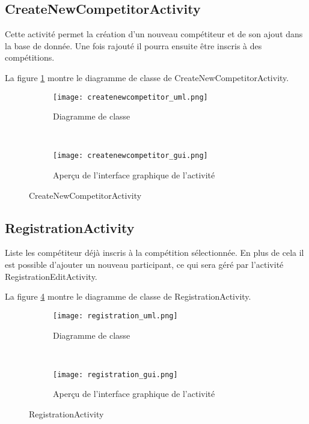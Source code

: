 \subsection{CreateNewCompetitorActivity}

Cette activité permet la création d'un nouveau compétiteur et de son ajout dans la base de donnée. Une fois rajouté il pourra ensuite être inscris à des compétitions.

La figure \ref{fig:createnewcompetitor_uml} montre le diagramme de classe de CreateNewCompetitorActivity.

\begin{figure}[htb!]
    \centering
    \begin{subfigure}[htb]{0.49\textwidth}
		\texttt{[image: createnewcompetitor\_uml.png]} 
		\caption{Diagramme de classe}
		\label{fig:createnewcompetitor_uml}
    \end{subfigure}
    ~ %
    \begin{subfigure}[htb]{0.49\textwidth}
		\texttt{[image: createnewcompetitor\_gui.png]} 
		\caption{Aperçu de l'interface graphique de l'activité}
		\label{fig:createnewcompetitor_gui}
    \end{subfigure}
    \caption{CreateNewCompetitorActivity}\label{fig:createnewcompetitor_fig}
\end{figure}

\subsection{RegistrationActivity}

Liste les compétiteur déjà inscris à la compétition sélectionnée. En plus de cela il est possible d'ajouter un nouveau participant, ce qui sera géré par l'activité RegistrationEditActivity.

La figure \ref{fig:registration_uml} montre le diagramme de classe de RegistrationActivity.

\begin{figure}[htb!]
    \centering
    \begin{subfigure}[htb]{0.49\textwidth}
		\texttt{[image: registration\_uml.png]} 
		\caption{Diagramme de classe}
		\label{fig:registration_uml}
    \end{subfigure}
    ~ %
    \begin{subfigure}[htb]{0.49\textwidth}
		\texttt{[image: registration\_gui.png]} 
		\caption{Aperçu de l'interface graphique de l'activité}
		\label{fig:registration_gui}
    \end{subfigure}
    \caption{RegistrationActivity}\label{fig:registration_fig}
\end{figure}

